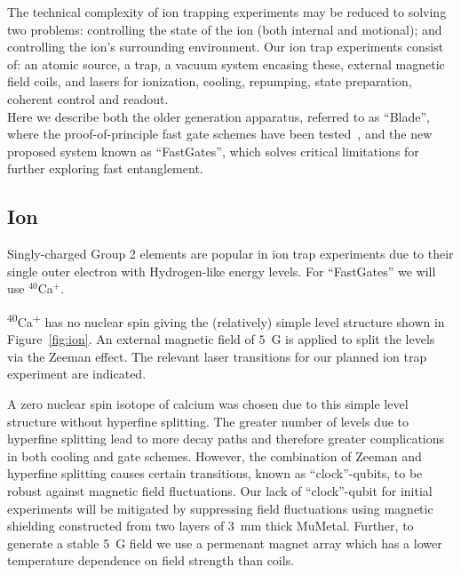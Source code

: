 \documentclass[12pt]{iopart}
\begin{document}
The technical complexity of ion trapping experiments may be reduced to
solving two problems: controlling the state of the ion (both internal
and motional); and controlling the ion's surrounding environment.
Our ion trap experiments consist of: an atomic source, a trap, a
vacuum system encasing these, external magnetic field coils, and
lasers for ionization, cooling, repumping, state preparation, coherent
control and readout.\\
Here we describe both the older generation apparatus, referred to as ``Blade'',
where the proof-of-principle fast gate schemes have been tested~\cite{saner_breaking_2023, schafer_fast_2018}, and the new proposed system known as
``FastGates'', which solves critical limitations for further exploring
fast entanglement.


\subsection{Ion}

Singly-charged Group 2 elements are popular in ion trap
experiments due to their single outer electron with Hydrogen-like
energy levels. For ``FastGates'' we will use $^{40}$Ca$^+$.

\textsuperscript{40}Ca\textsuperscript{+} has
no nuclear spin giving the
(relatively) simple level structure shown in Figure~\ref{fig:ion}. An external
magnetic field of $5$~G is applied to split the levels via the Zeeman
effect. The relevant laser transitions for our planned ion trap
experiment are indicated.

A zero nuclear spin isotope of calcium was chosen due to this simple
level structure without hyperfine splitting. The greater number of
levels due to hyperfine splitting lead to more decay paths and
therefore greater complications in both cooling and gate schemes.
However, the combination of Zeeman and hyperfine splitting causes
certain transitions, known as ``clock''-qubits, to be robust against
magnetic field fluctuations. Our lack of ``clock''-qubit for initial
experiments will be mitigated by suppressing field fluctuations using
magnetic shielding constructed from two layers of 3~mm thick
MuMetal. Further, to generate a stable 5~G field we use a permenant
magnet array which has a lower temperature dependence on field
strength than coils.

\end{document}

